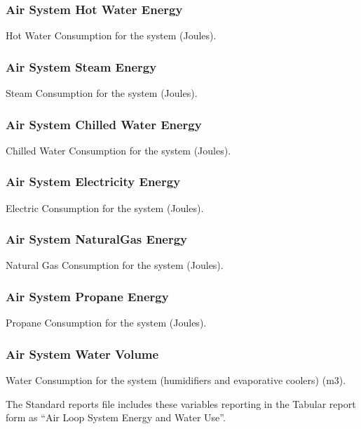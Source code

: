 \subsubsection{Air System Hot Water Energy}\label{air-system-hot-water-energy}

Hot Water Consumption for the system (Joules).

\subsubsection{Air System Steam Energy}\label{air-system-steam-energy}

Steam Consumption for the system (Joules).

\subsubsection{Air System Chilled Water Energy}\label{air-system-chilled-water-energy}

Chilled Water Consumption for the system (Joules).

\subsubsection{Air System Electricity Energy}\label{air-system-electric-energy}

Electric Consumption for the system (Joules).

\subsubsection{Air System NaturalGas Energy}\label{air-system-gas-energy}

Natural Gas Consumption for the system (Joules).

\subsubsection{Air System Propane Energy}

Propane Consumption for the system (Joules).

\subsubsection{Air System Water Volume}\label{air-system-water-volume}

Water Consumption for the system (humidifiers and evaporative coolers) (m3).

The Standard reports file includes these variables reporting in the Tabular report form as ``Air Loop System Energy and Water Use''.

